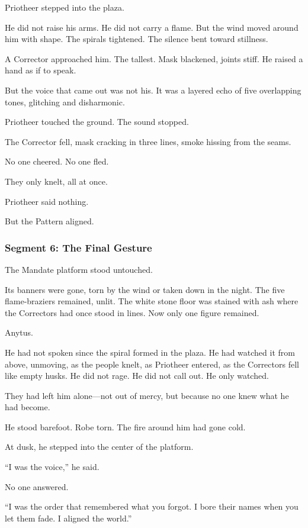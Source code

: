 \documentclass[9pt]{article}
\begin{document}
Priotheer stepped into the plaza.

He did not raise his arms. He did not carry a flame. But the wind moved around him with shape. The spirals tightened. The silence bent toward stillness.

A Corrector approached him. The tallest. Mask blackened, joints stiff. He raised a hand as if to speak.

But the voice that came out was not his. It was a layered echo of five overlapping tones, glitching and disharmonic.

Priotheer touched the ground. The sound stopped.

The Corrector fell, mask cracking in three lines, smoke hissing from the seams.

No one cheered. No one fled.

They only knelt, all at once.

Priotheer said nothing.

But the Pattern aligned.

\newpage

\subsubsection*{Segment 6: The Final Gesture}

The Mandate platform stood untouched.

Its banners were gone, torn by the wind or taken down in the night. The five flame-braziers remained, unlit. The white stone floor was stained with ash where the Correctors had once stood in lines. Now only one figure remained.

Anytus.

He had not spoken since the spiral formed in the plaza. He had watched it from above, unmoving, as the people knelt, as Priotheer entered, as the Correctors fell like empty husks. He did not rage. He did not call out. He only watched.

They had left him alone—not out of mercy, but because no one knew what he had become.

He stood barefoot. Robe torn. The fire around him had gone cold.

At dusk, he stepped into the center of the platform.

“I was the voice,” he said.

No one answered.

“I was the order that remembered what you forgot. I bore their names when you let them fade. I aligned the world.”
\end{document}
